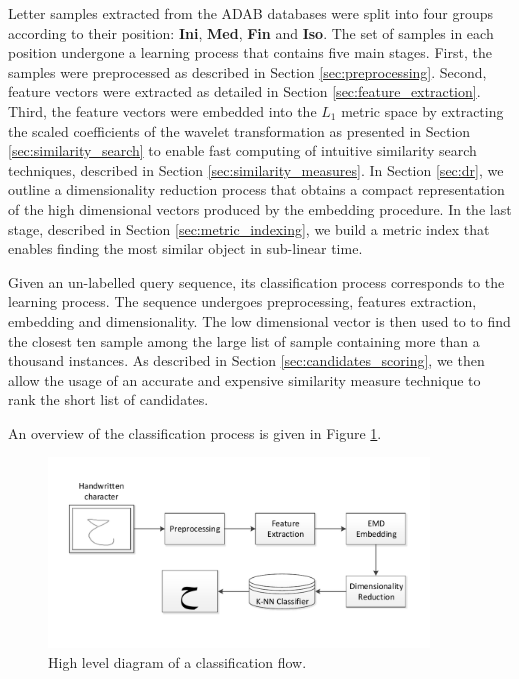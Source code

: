 \iftoggle{edit-mode}{\hspace{0pt}\marginpar{The learning process}}{}
Letter samples extracted from the ADAB databases were split into four groups according to their position: \textbf{Ini}, \textbf{Med}, \textbf{Fin} and \textbf{Iso}. 
The set of samples in each position undergone a learning process that contains five main stages.
First, the samples were preprocessed as described in Section \ref{sec:preprocessing}.
Second, feature vectors were extracted as detailed in Section \ref{sec:feature_extraction}.
Third, the feature vectors were embedded into the $L_1$ metric space by extracting the scaled coefficients of the wavelet transformation as presented in Section \ref{sec:similarity_search} to enable fast computing of intuitive similarity search techniques, described in Section \ref{sec:similarity_measures}.
In Section \ref{sec:dr}, we outline a dimensionality reduction process that obtains a compact representation of the high dimensional vectors produced by the embedding procedure.
In the last stage, described in Section \ref{sec:metric_indexing}, we build a metric index that enables finding the most similar object in sub-linear time.

\iftoggle{edit-mode}{\hspace{0pt}\marginpar{The recognition process}}{}
Given an un-labelled query sequence, its classification process corresponds to the learning process.
The sequence undergoes preprocessing, features extraction, embedding and dimensionality.
The low dimensional vector is then used to to find the closest ten sample among the large list of sample containing more than a thousand instances.
As described in Section \ref{sec:candidates_scoring}, we then allow the usage of an accurate and expensive similarity measure technique to rank the short list of candidates. 

An overview of the classification process is given in Figure \ref{fig:letters_classifier_learning_flow}.

\begin{figure}
\centering
\includegraphics[width=0.9\textwidth]{./figures/letters_classifier_learning_flow}       
\caption{High level diagram of a classification flow.}
\label{fig:letters_classifier_learning_flow}
\end{figure}


